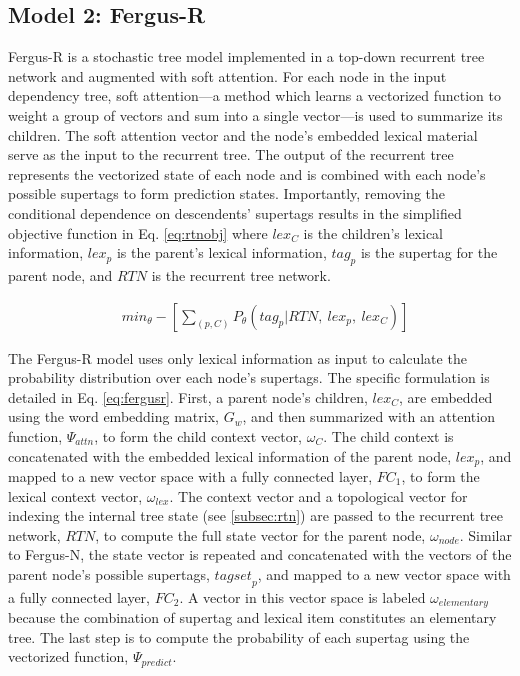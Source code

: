 \documentclass[11pt]{article}
\begin{document}
\subsection{Model 2: Fergus-R}

Fergus-R is a stochastic tree model implemented in a top-down recurrent tree network and augmented with soft attention.
%
For each node in the input dependency tree, soft attention---a method which learns a vectorized function to weight a group of vectors and sum into a single vector---is used to summarize its children.
%
The soft attention vector and the node's embedded lexical material serve as the input to the recurrent tree.
%
The output of the recurrent tree represents the vectorized state of each node and is combined with each node's possible supertags to form prediction states.
%
%
%
Importantly, removing the conditional dependence on descendents' supertags
results in the simplified objective function in Eq. \ref{eq:rtnobj} where $lex_C$ is the children's lexical information, $lex_p$ is the parent's lexical information, $tag_p$ is the supertag for the parent node, and $RTN$ is the recurrent tree network. 

\begin{align}
&min_{\theta} -[\sum_{(p,C)} P_\theta(tag_{p}|RTN,~lex_p,~lex_{C})] \label{eq:rtnobj}
\end{align}

The Fergus-R model uses only lexical information as input to calculate the probability distribution over each node's supertags. 
%
The specific formulation is detailed in Eq. \ref{eq:fergusr}.
%
First, a parent node's children, $lex_C$, are embedded using the word embedding matrix, $G_w$, and then summarized with an attention function, $\Psi_{attn}$, to form the child context vector, $\omega_{C}$. 
%
The child context is concatenated with the embedded lexical information of the parent node, $lex_p$, and mapped to a new vector space with a fully connected layer, $FC_1$, to form the lexical context vector, $\omega_{lex}$.
%
The context vector and a topological vector for indexing the internal tree state (see \ref{subsec:rtn}) are passed to the recurrent tree network, $RTN$, to compute the full state vector for the parent node, $\omega_{node}$.
%
Similar to Fergus-N, the state vector is repeated and concatenated with the vectors of the parent node's possible supertags, ${tagset}_p$, and mapped to a new vector space with a fully connected layer, $FC_2$.
%
A vector in this vector space is labeled $\omega_{elementary}$ because the combination of supertag and lexical item constitutes an elementary tree.
%
The last step is to compute the probability of each supertag using the vectorized function, $\Psi_{predict}$.
\end{document}
